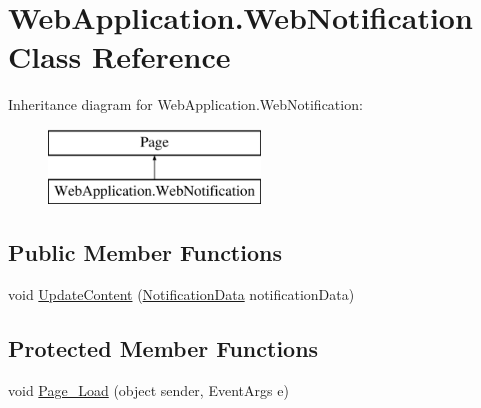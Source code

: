 \hypertarget{classWebApplication_1_1WebNotification}{}\section{Web\+Application.\+Web\+Notification Class Reference}
\label{classWebApplication_1_1WebNotification}
Inheritance diagram for Web\+Application.\+Web\+Notification\+:\begin{figure}[H]
\begin{center}
\leavevmode
\includegraphics[height=2.000000cm]{da/d6c/classWebApplication_1_1WebNotification}
\end{center}
\end{figure}
\subsection*{Public Member Functions}
\begin{DoxyCompactItemize}
\item 
void \mbox{\hyperlink{classWebApplication_1_1WebNotification_a1e5658d5d3268498cc2bfb560b4851b8}{Update\+Content}} (\mbox{\hyperlink{classWebApplication_1_1Framework_1_1NotificationData}{Notification\+Data}} notification\+Data)
\end{DoxyCompactItemize}
\subsection*{Protected Member Functions}
\begin{DoxyCompactItemize}
\item 
void \mbox{\hyperlink{classWebApplication_1_1WebNotification_aa48b42fe1fb4e4e1909063081de270f9}{Page\+\_\+\+Load}} (object sender, Event\+Args e)
\end{DoxyCompactItemize}
